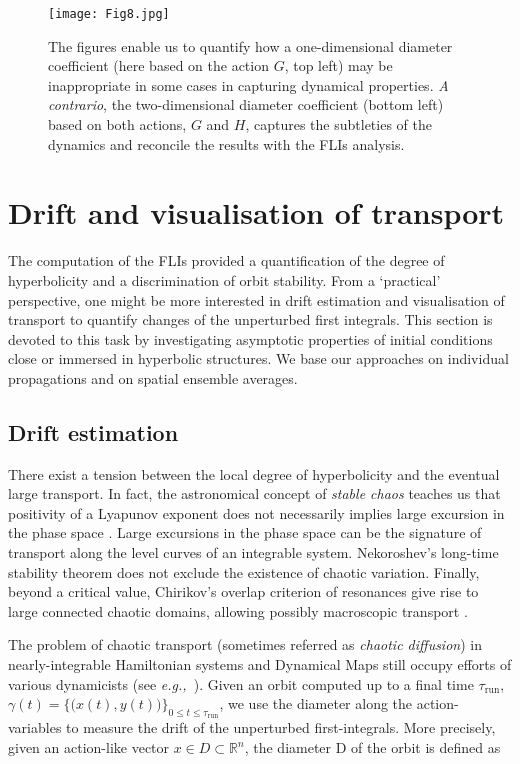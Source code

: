 \documentclass{amsart}
\theoremstyle{definition}
\theoremstyle{remark}
\numberwithin{equation}{section}
\newcommand{\eg}{\textit{e.g.,\ }}
\begin{document}
\begin{figure}
\texttt{[image: Fig8.jpg]} 
\caption{\label{fig:D1dvsD2d} The figures enable us to quantify how a one-dimensional diameter coefficient (here based on the action $G$, top left) may be inappropriate in some cases in capturing dynamical properties. \textit{A contrario}, the two-dimensional diameter coefficient (bottom left) based on both actions, $G$ and $H$, captures the subtleties of the dynamics  and reconcile the results with the FLIs analysis.} 	
\end{figure}

\section{Drift and visualisation of transport}\label{Sec:DriftTransport}
The computation of the FLIs provided a quantification of the degree of hyperbolicity and a discrimination of orbit stability. From a `practical' perspective, one might be more interested in drift estimation and visualisation of  transport  to {\color{black}quantify} changes of the  unperturbed first integrals.  
This section is devoted to this task by investigating asymptotic properties of initial conditions close or immersed in hyperbolic structures. We base our approaches on individual propagations and on spatial ensemble averages.

\subsection{Drift estimation}
There exist a tension between the local degree of hyperbolicity and the eventual large transport. 
In fact, the astronomical concept of \textit{stable chaos} 
teaches us that  positivity of a Lyapunov exponent does not necessarily implies large excursion 
in the phase space \citep{aMi92}. Large excursions in the phase space can be the signature of  
transport along the level curves of an integrable system. Nekoroshev's long-time stability 
theorem does not exclude the existence of chaotic variation.  Finally, beyond a critical value, 
Chirikov's overlap criterion of resonances 
give rise to large connected chaotic domains, allowing possibly macroscopic transport 
\citep{bCh79}. 

The problem of  chaotic transport (sometimes referred as \textit{chaotic diffusion}) in nearly-integrable Hamiltonian systems and Dynamical Maps still occupy efforts of various dynamicists 
(see \eg \cite{sLa16,nGu17,pCi18}). 
Given an orbit  computed up to a final time $\tau_{\textrm{run}}$, $\gamma(t)=\big\{\big(x(t),y(t)
\big)\big\}_{0 \le t\le \tau_{\textrm{run}}}$, we use the diameter along the action-variables  to 
measure the drift of the unperturbed first-integrals. More precisely, given an action-like vector 
$x \in D \subset \mathbb{R}^{n}$, the diameter D of the orbit is defined as 
\end{document}
